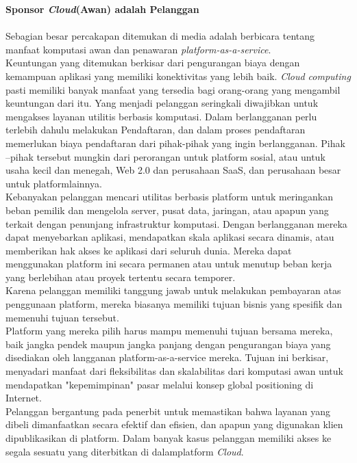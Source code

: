 \textbf{Sponsor   \textit{Cloud}(Awan)  adalah Pelanggan}\\\\
Sebagian besar percakapan ditemukan di media adalah berbicara tentang manfaat komputasi awan dan  penawaran \textit{platform-as-a-service}.\\
Keuntungan yang ditemukan berkisar dari pengurangan biaya dengan kemampuan  aplikasi  yang memiliki konektivitas yang lebih baik. \textit{Cloud computing}  pasti  memiliki  banyak  manfaat yang tersedia bagi orang-orang yang mengambil keuntungan dari itu. Yang menjadi pelanggan seringkali diwajibkan untuk mengakses layanan  utilitis  berbasis  komputasi. Dalam berlangganan perlu terlebih dahulu melakukan Pendaftaran, dan dalam proses pendaftaran memerlukan biaya pendaftaran dari pihak-pihak yang ingin  berlangganan.  Pihak  –pihak tersebut mungkin dari perorangan untuk platform sosial, atau untuk usaha kecil dan menegah, Web 2.0 dan perusahaan SaaS, dan perusahaan besar  untuk platformlainnya.\\
\tab Kebanyakan pelanggan mencari utilitas berbasis platform untuk meringankan beban pemilik dan mengelola server, pusat data, jaringan, atau apapun yang terkait dengan penunjang infrastruktur komputasi. Dengan berlangganan mereka dapat menyebarkan  aplikasi, mendapatkan skala aplikasi secara dinamis, atau memberikan hak akses ke  aplikasi  dari seluruh dunia. Mereka dapat menggunakan platform ini secara permanen atau untuk menutup beban kerja yang berlebihan atau proyek tertentu secara temporer.\\
\tab Karena pelanggan memiliki tanggung jawab untuk melakukan pembayaran atas penggunaan platform, mereka biasanya memiliki tujuan bisnis yang spesifik dan memenuhi tujuan tersebut.\\
Platform yang mereka pilih harus mampu memenuhi tujuan bersama mereka, baik  jangka pendek maupun jangka panjang dengan pengurangan biaya yang disediakan oleh langganan platform-as-a-service mereka. Tujuan ini berkisar, menyadari manfaat dari fleksibilitas dan skalabilitas dari komputasi awan untuk mendapatkan "kepemimpinan" pasar melalui   konsep global positioning di Internet.\\
Pelanggan bergantung pada penerbit untuk memastikan bahwa layanan yang dibeli dimanfaatkan secara efektif dan efisien, dan apapun yang digunakan klien dipublikasikan di platform. Dalam banyak kasus pelanggan memiliki akses ke segala sesuatu yang diterbitkan di dalamplatform \textit{Cloud}.\\\\
